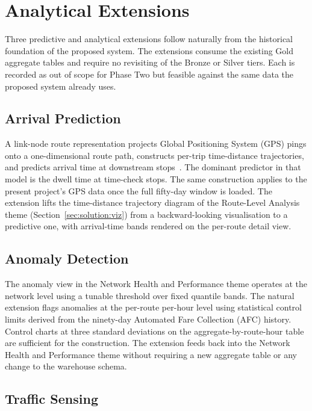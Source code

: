 \section{Analytical Extensions}
\label{sec:future:extensions}

Three predictive and analytical extensions follow naturally from the historical foundation of the proposed system. The extensions consume the existing Gold aggregate tables and require no revisiting of the Bronze or Silver tiers. Each is recorded as out of scope for Phase Two but feasible against the same data the proposed system already uses.

\subsection{Arrival Prediction}

A link-node route representation projects Global Positioning System (GPS) pings onto a one-dimensional route path, constructs per-trip time-distance trajectories, and predicts arrival time at downstream stops~\cite{linzeng2014}. The dominant predictor in that model is the dwell time at time-check stops. The same construction applies to the present project's GPS data once the full fifty-day window is loaded. The extension lifts the time-distance trajectory diagram of the Route-Level Analysis theme (Section~\ref{sec:solution:viz}) from a backward-looking visualisation to a predictive one, with arrival-time bands rendered on the per-route detail view.

\subsection{Anomaly Detection}

The anomaly view in the Network Health and Performance theme operates at the network level using a tunable threshold over fixed quantile bands. The natural extension flags anomalies at the per-route per-hour level using statistical control limits derived from the ninety-day Automated Fare Collection (AFC) history. Control charts at three standard deviations on the aggregate-by-route-hour table are sufficient for the construction. The extension feeds back into the Network Health and Performance theme without requiring a new aggregate table or any change to the warehouse schema.

\subsection{Traffic Sensing}

